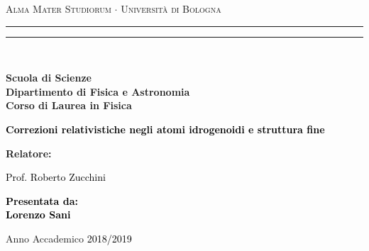 \documentclass[12pt,a4paper]{report}
\numberwithin{equation}{section}
\numberwithin{section}{chapter}
\begin{document}
\begin{titlepage}
%
%
%
%
\begin{center}
{{\Large{\textsc{Alma Mater Studiorum $\cdot$ Universit\`a di Bologna}}}} 
\rule[0.1cm]{15.8cm}{0.1mm}
\rule[0.5cm]{15.8cm}{0.6mm}
\\\vspace{3mm}

{\small{\bf Scuola di Scienze \\ 
Dipartimento di Fisica e Astronomia\\
Corso di Laurea in Fisica}}

\end{center}

\vspace{23mm}

\begin{center}\textcolor{black}{
%
%
{\LARGE{\bf Correzioni relativistiche negli atomi idrogenoidi e struttura fine}}\\
}\end{center}

\vspace{50mm} \par \noindent

\begin{minipage}[t]{0.47\textwidth}
%
%
{\large{\bf Relatore: \vspace{2mm}
		\par\textcolor{black}{
Prof. Roberto Zucchini}\par
%
%
%
}}

\end{minipage}
%
\hfill
%
\begin{minipage}[t]{0.47\textwidth}\raggedleft \textcolor{black}{
{\large{\bf Presentata da:
\vspace{2mm}\\
%
%
Lorenzo Sani}}}
\end{minipage}

\vspace{40mm}


\begin{center}
%
%
Anno Accademico \textcolor{black}{ 2018/2019}
\end{center}

\end{titlepage}
\tableofcontents
\hypersetup{pageanchor=false}
\end{document}
